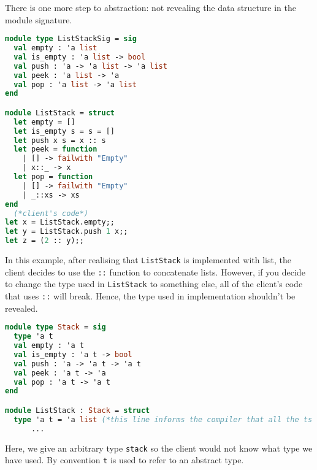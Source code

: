 \documentclass[12pt,a4paper]{article} %
\begin{document}
There is one more step to abstraction: not revealing the data structure in the module signature.
\begin{lstlisting}[language=Caml]
module type ListStackSig = sig
  val empty : 'a list
  val is_empty : 'a list -> bool
  val push : 'a -> 'a list -> 'a list
  val peek : 'a list -> 'a
  val pop : 'a list -> 'a list
end

module ListStack = struct
  let empty = []
  let is_empty s = s = []
  let push x s = x :: s
  let peek = function
    | [] -> failwith "Empty"
    | x::_ -> x
  let pop = function
    | [] -> failwith "Empty"
    | _::xs -> xs
end
  (*client's code*)
let x = ListStack.empty;;
let y = ListStack.push 1 x;;
let z = (2 :: y);; 
\end{lstlisting}
In this example, after realising that \verb|ListStack| is implemented with list, the client decides to use the \verb|::| function to concatenate lists. However, if you decide to change the type used in \verb|ListStack| to something else, all of the client's code that uses \verb|::| will break. Hence, the type used in implementation shouldn't be revealed.
\begin{lstlisting}[language=Caml]
module type Stack = sig
  type 'a t
  val empty : 'a t
  val is_empty : 'a t -> bool
  val push : 'a -> 'a t -> 'a t
  val peek : 'a t -> 'a
  val pop : 'a t -> 'a t
end

module ListStack : Stack = struct
  type 'a t = 'a list (*this line informs the compiler that all the ts refer to lists*)
      ...
\end{lstlisting}
Here, we give an arbitrary type \verb|stack| so the client would not know what type we have used. By convention \verb|t| is used to refer to an abstract type.
\end{document}
